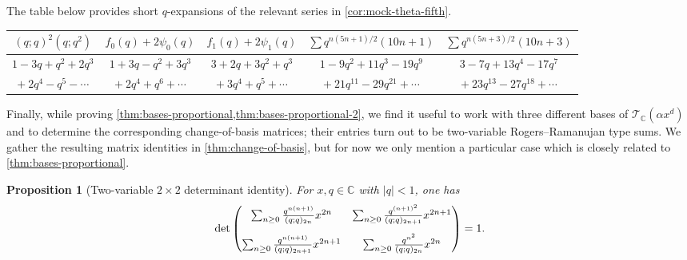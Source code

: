 \documentclass[reqno,11pt]{amsart}
\newtheorem{proposition}[theorem]{Proposition}
\theoremstyle{definition}
\theoremstyle{remark}
\numberwithin{equation}{section}
\renewcommand{\arraystretch}{1.2}
\newcommand{\C}{\mathbb{C}}
\newcommand{\E}{\textnormal E}
\newcommand{\mT}{\mathcal{T}}
\begin{document}
The table below provides short $q$-expansions of the relevant series in \cref{cor:mock-theta-fifth}.

\begin{center} \small
\renewcommand{\arraystretch}{1.5}
\begin{tabular}{c|c|c|c|c}
     $(q; q)^2 \left(q; q^2\right)$ & $f_0(q) + 2\psi_0(q)$ & $f_1(q) + 2\psi_1(q)$ & $\sum q^{n(5n+1)/2} (10 n + 1)$ & $\sum q^{n(5n+3)/2} (10 n + 3)$\\
     \hline
     \footnotesize{$1 - 3q + q^2 + 2q^3$}
     &
     \footnotesize{$1 + 3q - q^2 + 3q^3$}
     &
     \footnotesize{$3 + 2q + 3q^2 + q^3$}
     &
     \footnotesize{$1 - 9q^2 + 11q^3 - 19q^9$}
     &
     \footnotesize{$3 - 7q + 13q^4 - 17q^7$}
     \\
     \footnotesize{$+\ 2q^4 - q^5 - \cdots$}
     &
     \footnotesize{$+\ 2q^4 + q^6 + \cdots$}
     &
     \footnotesize{$+\ 3q^4 + q^5 + \cdots$}
     &
     \footnotesize{$+\ 21 q^{11} - 29 q^{21} + \cdots$}
     &
     \footnotesize{$+\ 23q^{13} - 27 q^{18} + \cdots$}
\end{tabular}
\end{center}


Finally, while proving \cref{thm:bases-proportional,thm:bases-proportional-2}, we find it useful to work with three different bases of $\mT_\C\left(\alpha x^d\right)$ and to determine the corresponding change-of-basis matrices; their entries turn out to be two-variable Rogers--Ramanujan type sums. We gather the resulting matrix identities in \cref{thm:change-of-basis}, but for now we only mention a particular case which is closely related to \cref{thm:bases-proportional}.

\begin{proposition}[Two-variable $2 \times 2$ determinant identity] \label{prop:2x2-determinant}
For $x, q \in \C$ with $|q| < 1$, one has 
\[
    \det 
    \begin{pmatrix}
    \sum_{n \ge 0} \frac{q^{n(n+1)}}{(q; q)_{2n}} x^{2n}
    & 
    \sum_{n \ge 0} \frac{q^{(n+1)^2}}{(q; q)_{2n+1}} x^{2n+1}
    \vspace{0.3cm} \\
    \sum_{n \ge 0} \frac{q^{n(n+1)}}{(q; q)_{2n+1}} x^{2n+1}
    &
    \sum_{n \ge 0} \frac{q^{n^2}}{(q; q)_{2n}} x^{2n}
    \end{pmatrix}
    = 1.
\]
\end{proposition}
\end{document}
